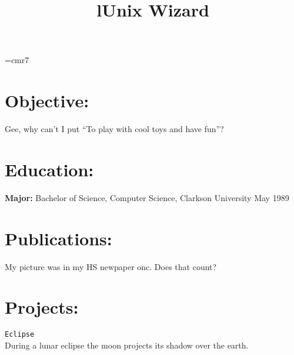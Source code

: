 

\font\attand=cmr7

\def\PS{{\tt P\small OST\tt S\small CRIPT}}
\def\ATT{{AT{\attand \&}T}}
\def\MF{{METAFONT}}
\def\Cplusplus{{\rm C\raise.5ex\hbox{\small ++}}}
\def\AmSTeX{{$\cal A\kern-.1667em\lower.5ex\hbox{$\cal M$}\kern-.125em
S$-\TeX}}



\address{2300 Naudain St\\
Phily, PA\\
(215) 546-0497\
{\tt mrd@sun.soe.clarkson.edu}}

\begin{resume}

\section{Objective:}
Gee, why can't I put ``To play with cool toys and have fun''?

\section{Education:}
{\bf Major:} Bachelor of Science, Computer Science, Clarkson
University May 1989\\


\section{Publications:}
My picture was in my HS newpaper onc. Does that count?


\section{Projects:}
{\tt Eclipse}\\
During a lunar eclipse the moon projects its shadow over the earth.


\begin{format}
\title{l}\\
\body\\
\end{format}

\title{Unix Wizard}


\end{resume}
